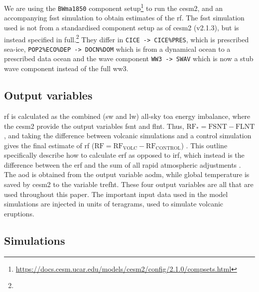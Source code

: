 \documentclass{ametsocV5}
\newcommand{\iso}[1][i]{{#1}njected \ce{SO2}}
\begin{document}
We are using the \texttt{BWma1850} component
setup\footnote{\url{https://docs.cesm.ucar.edu/models/cesm2/config/2.1.0/compsets.html}}
to run the \ac{cesm2}, and an accompanying \ac{fsst}
simulation to obtain estimates of the \ac{rf}. The \ac{fsst} simulation used is not from
a standardised component setup as of \ac{cesm2} (v2.1.3), but is instead specified in
full.\footnote{\fssturl}
%
They differ in \texttt{CICE -> CICE\%PRES}, which is prescribed sea-ice,
\texttt{POP2\%ECO\%DEP -> DOCN\%DOM} which is from a dynamical ocean to a prescribed
data ocean and the wave component \texttt{WW3 -> SWAV} which is now a stub wave
component instead of the full \ac{ww3}.

\subsection{Output variables}

\Ac{rf} is calculated as the combined (\ac{sw} and \ac{lw}) all-sky \ac{toa} energy
imbalance, where the \ac{cesm2} provide the output variables \ac{fsnt} and \ac{flnt}.
Thus, \(\mathrm{RF_*}= \mathrm{FSNT} - \mathrm{FLNT}\), and taking the difference
between volcanic simulations and a control simulation gives the final estimate of
\ac{rf} (\(\mathrm{RF}=\mathrm{RF_{VOLC}}-\mathrm{RF_{CONTROL}}\)) \citep{marshall2020}.
This outline specifically describe how to calculate \ac{erf} as opposed to \ac{irf},
which instead is the difference between the \ac{erf} and the sum of all rapid
atmospheric adjustments \citep{marshall2020,smith2018}. The \ac{aod} is obtained from
the output variable \ac{aodm}, while global temperature is saved by \ac{cesm2} to the
variable \ac{trefht}. These four output variables are all that are used throughout this
paper. The important input data used in the model simulations are \iso{} in units of
teragrams, used to simulate volcanic eruptions.

\subsection{Simulations}
\end{document}
